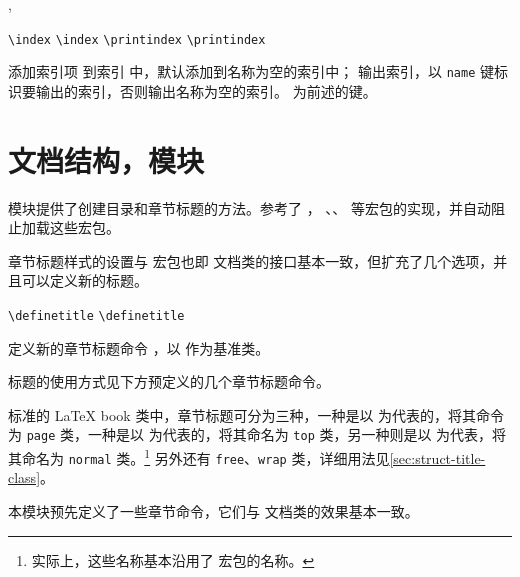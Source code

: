 \documentclass[twoside]{book}
\begin{document}
\begin{function}{\index,\printindex}
  \begin{syntax}
    \verb|\index| 
    \verb|\index|  
    \verb|\printindex|
    \verb|\printindex| 
  \end{syntax}
 添加索引项  到索引  中，默认添加到名称为空的索引中； 输出索引，以 \texttt{name} 键标识要输出的索引，否则输出名称为空的索引。 为前述的键。
\end{function}


\section{文档结构，模块}

 模块提供了创建目录和章节标题的方法。参考了 ，
、、 等宏包的实现，并自动阻止加载这些宏包。

章节标题样式的设置与  宏包也即 \CTeX 文档类的接口基本一致，但扩充了几个选项，并且可以定义新的标题。

\begin{function}{}
  \begin{syntax}
    \verb|\definetitle|  
    \verb|\definetitle|   
  \end{syntax}
定义新的章节标题命令 ，以  作为基准类。

标题的使用方式见下方预定义的几个章节标题命令。
\end{function}

标准的 {\LaTeX} book 类中，章节标题可分为三种，一种是以  为代表的，\CusTeX 将其命令为 \texttt{page} 类，一种是以  为代表的，\CusTeX 将其命名为 \texttt{top} 类，另一种则是以  为代表，\CusTeX 将其命名为 \texttt{normal} 类。\footnote{实际上，这些名称基本沿用了  宏包的名称。}
另外还有 \texttt{free}、\texttt{wrap} 类，详细用法见\cref{sec:struct-title-class}。

本模块预先定义了一些章节命令，它们与  文档类的效果基本一致。
\end{document}
